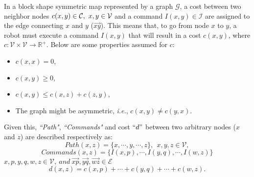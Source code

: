 \documentclass[smallcondensed]{svjour3}
\begin{document}
In a block shape symmetric map represented by a graph $\mathcal{G}$, a cost between two neighbor nodes $\sloppy c(x,y)\in \mathcal{C},~ x,y \in \mathcal{V}$ and a command $I(x,y) \in \mathcal{I}$ are assigned to the edge connecting $x$ and $y$ ($\overrightarrow{xy}$). This means that, to go from node $x$ to $y$, a robot must execute a command $I(x,y)$ that will result in a cost $c(x,y)$,
%
where $c:\mathcal{V} \times \mathcal{V} \rightarrow\mathbb{R}^+$. 
Below are some properties assumed for $c$:
%
\begin{itemize}
\item $c(x,x)=0$,
\item $c(x,y)\geq0$, 
\item $c(x,y)\leq c(x,z)+c(z,y)$,
\item The  graph might be asymmetric, \emph{i.e.}, $c(x,y)\neq c(y,x)$.
\end{itemize}
%

Given this, \textit{``Path"}, \textit{``Commands"} and cost $``d"$ between two arbitrary nodes ($x$ and $z$) are described respectively as:%
\[Path(x,z)=\{x,\cdots,y,\cdots,z\}, ~~x,y,z \in \mathcal V,\]
%
\[Commands(x,z)= \{I(x,p),\cdots,I(y,q),\cdots,I(w,z)\}\]
$x,p,y,q,w,z \in \mathcal V, ~and~ \overrightarrow{xp}, \overrightarrow{yq}, \overrightarrow{wz} \in \mathcal{E}$
%
\[d(x,z)=c(x,p)+\cdots+c(y,q)+\cdots+c(w,z).\]
\end{document}
